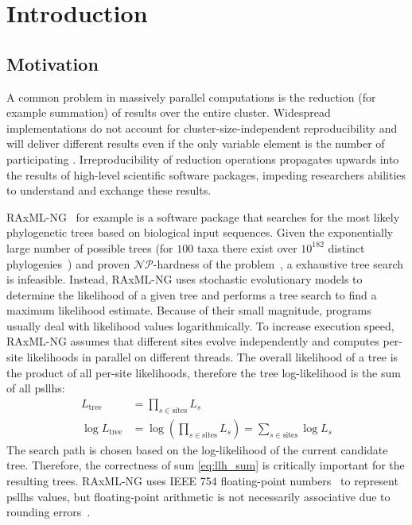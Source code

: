 \chapter{Introduction}
\label{ch:Introduction}

\section{Motivation}
\label{sec:Motivation}
A common problem in massively parallel computations is the reduction (for example summation) of results over the entire cluster.
Widespread implementations do not account for cluster-size-independent reproducibility and will deliver different results
even if the only variable element is the number of participating .
Irreproducibility of reduction operations propagates upwards into the results of high-level scientific software packages, impeding researchers abilities to understand and exchange these results.

RAxML-NG~\cite{kozlov_raxml-ng_2019} for example is a software package that searches for the most likely phylogenetic trees based on biological input sequences.
Given the exponentially large number of possible trees (for $100$ taxa there exist over $10^{182}$ distinct phylogenies~\cite{stamatakis_efficient_2020}) and proven $\mathcal{NP}$-hardness of the problem~\cite{roch_short_2006}, a exhaustive tree search is infeasible.
Instead, RAxML-NG uses stochastic evolutionary models to determine the likelihood of a given tree and performs a tree search to find a maximum likelihood estimate.
Because of their small magnitude, programs usually deal with likelihood values logarithmically.
To increase execution speed, RAxML-NG assumes that different sites evolve independently and computes per-site likelihoods in parallel on different threads.
The overall likelihood of a tree is the product of all per-site likelihoods, therefore the tree log-likelihood is the sum of all \glspl{psllh}:
\begin{align}
L_{\textrm{tree}} &= \prod_{s \in \textrm{sites}} L_s \\
\label{eq:llh_sum}
\log L_{\textrm{tree}} &= \log \left(\prod_{s \in \textrm{sites}} L_s\right) = \sum_{s \in \textrm{sites}}  \log L_s
\end{align}
The search path is chosen based on the log-likelihood of the current candidate tree.
Therefore, the correctness of sum \eqref{eq:llh_sum} is critically important for the resulting trees.
RAxML-NG uses IEEE 754 floating-point numbers~\cite{noauthor_ieee_nodate} to represent \glspl{psllh} values, but floating-point arithmetic is not necessarily associative due to rounding errors~\cite{goldberg_what_1991}.

